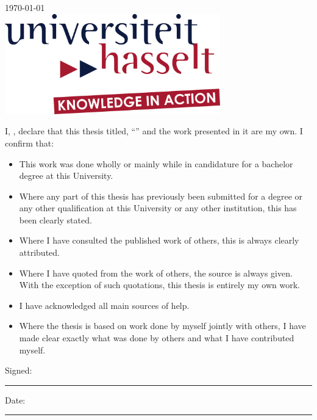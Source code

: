 \documentclass[
11pt, %
english, %
singlespacing, %
headsepline, %
]{MastersDoctoralThesis} %
\begin{document}
\begin{titlepage}
\begin{center}
{\large \monthyeardate\today}~\\[1cm] %
 \includegraphics[width=0.7\textwidth]{LOGO}~\\[1cm]

\vfill
\end{center}
\end{titlepage}


\begin{declaration}
\addchaptertocentry{\authorshipname}

\noindent I, \authorname, declare that this thesis titled, \enquote{\ttitle} and the work presented in it are my own. I confirm that:

\begin{itemize} 
\item This work was done wholly or mainly while in candidature for a bachelor degree at this University.
\item Where any part of this thesis has previously been submitted for a degree or any other qualification at this University or any other institution, this has been clearly stated.
\item Where I have consulted the published work of others, this is always clearly attributed.
\item Where I have quoted from the work of others, the source is always given. With the exception of such quotations, this thesis is entirely my own work.
\item I have acknowledged all main sources of help.
\item Where the thesis is based on work done by myself jointly with others, I have made clear exactly what was done by others and what I have contributed myself.\\
\end{itemize}
 
\noindent Signed:\\
\rule[0.5em]{25em}{0.5pt} %
 
\noindent Date:\\
\rule[0.5em]{25em}{0.5pt} %
\end{declaration}
\end{document}
